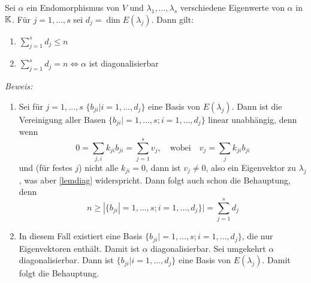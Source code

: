 \begin{mysatz} \qquad \par
    Sei $\alpha$ ein Endomorphismus von $V$ und $\lambda_1,\ldots,\lambda_s$ verschiedene Eigenwerte von $\alpha$ in $\mathbb{K}$. Für $j=1,\ldots,s$ sei $
    d_j=\dim E(\lambda_j)$. Dann gilt:
    \begin{enumerate}
        \item $\displaystyle{\sum_{j=1}^s d_j \leq n}$
        \item $\displaystyle{\sum_{j=1}^s d_j = n \Leftrightarrow \alpha}$ ist diagonalisierbar
    \end{enumerate}

\textit{Beweis:}
    \begin{enumerate}
        \item Sei für $j=1,\ldots,s$ $\lbrace b_{ji}|i=1,\ldots,d_j \rbrace$ eine Basis von $E(\lambda_j)$. Dann ist die Vereinigung aller Basen 
            $\lbrace b_{ji}|=1,\ldots,s; i=1,\ldots,d_j \rbrace$ linear unabhängig, denn wenn
            \begin{equation*}
                0=\sum_{j,i} k_{ji}b_{ji} = \sum_{j=1}^s v_j, \quad \mbox{wobei} \quad v_j=\sum_j k_{ji}b_{ji} 
            \end{equation*}
            und (für festes $j$) nicht alle $k_{ji}=0$, dann ist $v_j\neq0$, also ein Eigenvektor zu $\lambda_j$, was aber \ref{lemdiag} 
            widerspricht. Dann folgt auch schon die Behauptung, denn
            \begin{equation*}
                n\geq |\lbrace b_{ji}|=1,\ldots,s; i=1,\ldots,d_j \rbrace|=\sum_{j=1}^s d_j
            \end{equation*}
        \item In diesem Fall existiert eine Basis $\lbrace b_{ji}|=1,\ldots,s; i=1,\ldots,d_j \rbrace$, die nur Eigenvektoren enthält. Damit ist 
            $\alpha$ diagonalisierbar. Sei umgekehrt $\alpha$ diagonalisierbar. Dann ist $\lbrace b_{ji}|i=1,\ldots,d_j \rbrace$ eine Basis von 
            $E(\lambda_j)$. Damit folgt die Behauptung.
    \end{enumerate}
\end{mysatz}

